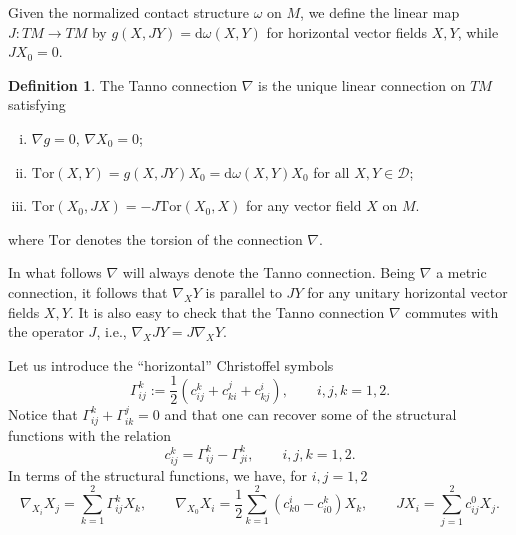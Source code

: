 \documentclass{amsart}
\theoremstyle{plain}
\theoremstyle{definition}
\newtheorem{definition}[thm]{Definition}
\theoremstyle{remark}
\newcommand{\Tor}{\mathrm{Tor}}
\newcommand{\distr}{\mathcal{D}}								%
\begin{document}
Given the normalized contact structure $\omega$ on $M$, we define the linear map $J:TM\to TM$ by $g(X,JY)=\mathrm{d}\omega(X,Y)$ for horizontal vector fields $X,Y$, while $JX_{0}=0$. 
\begin{definition}
\label{def:Tanno}
The Tanno connection $\nabla$ is the unique linear  connection on $TM$ satisfying
\begin{enumerate}[(i)]
\item $\nabla g=0$, $\nabla X_0=0$;
\item $\Tor(X,Y)=g(X,JY) X_0=\mathrm{d}\omega(X,Y)X_0$ for all $X,Y\in\distr$;
\item $\Tor(X_0,JX)=-J\Tor(X_0,X)$ for any vector field $X$ on $M$. 
\end{enumerate}
where $\Tor$ denotes the torsion of the connection $\nabla$.
\end{definition}
In what follows $\nabla$ will always denote the Tanno connection. Being $\nabla$ a metric connection, it follows that $\nabla_XY$ is parallel to $JY$ for any unitary horizontal vector fields $X,Y$. 
It is also easy to check that the Tanno connection $\nabla$ commutes with the operator $J$, i.e., $\nabla_XJY=J\nabla_XY.$

Let us introduce the ``horizontal'' Christoffel symbols
\begin{equation}\label{eq:db4bis}
\Gamma_{ij}^k := \frac{1}{2}\left( c_{ij}^k + c_{ki}^j + c_{kj}^i \right), \qquad i,j,k=1,2.
\end{equation}
Notice that $\Gamma_{ij}^k + \Gamma_{ik}^j=0$ and that one can recover some of the structural functions with the relation
\begin{equation}\label{eq:db4}
c_{ij}^k = \Gamma_{ij}^k - \Gamma_{ji}^k,  \qquad i,j,k=1,2.
\end{equation}
In terms of the structural functions, we have, for $i,j=1,2$
\begin{equation}\label{eq:db5}
\nabla_{X_i} X_j = \sum_{k=1}^{2} \Gamma_{ij}^k X_k, \qquad \nabla_{X_0} X_i = \frac{1}{2}\sum_{k=1}^{2}(c_{k0}^i - c_{i0}^k) X_k, \qquad JX_i = \sum_{j=1}^{2} c_{ij}^0 X_j.
\end{equation}
\end{document}
